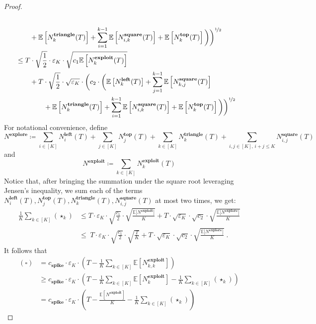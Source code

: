 \documentclass[final,12pt]{colt2025}
\newcommand{\E}{\mathbb{E}}
\newcommand{\e}{\varepsilon}
\newcommand{\lrb}[1]{\left(#1\right)}
\newcommand{\lsb}[1]{\left[#1\right]}
\newcommand{\bsb}[1]{\bigl[#1\bigr]}
\newcommand{\nc}{c}
\begin{document}
{\begin{proof}
\begin{align*}
\\
& \qquad
+
    \E\lsb{N^{\textbf{triangle}}_{k}(T)}
    + \sum_{i=1}^{k-1} \E\lsb{N^{\textbf{square}}_{i,k}(T)}
    + \E\lsb{N^{\textbf{top}}_k(T)}\bigg) \bigg)^{\nicefrac{1}{2}}
\\
&\le
      T \cdot \sqrt{ \frac{1}{2} } \cdot \e_K \cdot \sqrt{ \nc_1 \E\lsb{ N^{\textbf{exploit}}_k(T)}}
\\
&\qquad +
    T \cdot \sqrt{ \frac{1}{2} } \cdot \sqrt{\e_K} \cdot \bigg( c_2 \cdot \bigg(\E\lsb{N^{\textbf{left}}_k(T)}
    + \sum_{j=1}^{k-1} \E\lsb{N^{\textbf{square}}_{k,j}(T)}
\\
&\qquad\qquad
+
    \E\lsb{N^{\textbf{triangle}}_{k}(T)}
    + \sum_{i=1}^{k-1} \E\lsb{N^{\textbf{square}}_{i,k}(T)}
    + \E\lsb{N^{\textbf{top}}_k(T)}\bigg) \bigg)^{\nicefrac{1}{2}}
\end{align*}
For notational convenience, define
\[
    N^{\textbf{explore}}
\coloneqq
    \sum_{i \in [K]} N^{\textbf{left}}_i(T) + \sum_{j \in [K]} N^{\textbf{top}}_j(T) + \sum_{k \in [K]} N^{\textbf{triangle}}_k(T) +
    \sum_{i,j\in [K], \, i+j\le K} N^{\textbf{square}}_{i,j}(T)
\]
and
\[
    N^{\textbf{exploit}}
\coloneqq
    \sum_{k \in [K]} N^{\textbf{exploit}}_k(T)
\]
Notice that, after bringing the summation under the square root leveraging Jensen's inequality, we sum each of the terms $N^{\textbf{left}}_i(T), N^{\textbf{top}}_j(T), N^{\textbf{triangle}}_k(T), N^{\textbf{square}}_{i,j}(T)$ at most two times, we get:
\begin{align*}
    \frac{1}{K}\sum_{k \in [K]} (\star_k)
&\le
    T\cdot \e_K \cdot \sqrt{\frac{\nc_1}{2}} \cdot \sqrt{\frac{\E\bsb{N^{\textbf{exploit}}}}{K}}
+
    T\cdot \sqrt{\e_K} \cdot \sqrt{ c_2} \cdot \sqrt{ \frac{\E\bsb{N^{\textbf{explore}}}}{K}}
\\
&\le\;
    T\cdot \e_K \cdot \sqrt{\frac{\nc_1}{2}} \cdot \sqrt{\frac{T}{K}}
+
    T\cdot \sqrt{\e_K} \cdot \sqrt{ c_2} \cdot \sqrt{ \frac{\E\bsb{N^{\textbf{explore}}}}{K}} \;.
\end{align*}
It follows that
\begin{align*}
     (\square)
&=
    c_{\textbf{spike}} \cdot \e_K \cdot \lrb{ T - \frac{1}{K}\sum_{k \in [K]} \E[N^{\textbf{exploit}}_{k,k}]}
\\
&\ge
    c_{\textbf{spike}} \cdot \e_K \cdot \lrb{ T - \frac{1}{K}\sum_{k \in [K]} \E[N^{\textbf{exploit}}_{k}] - \frac{1}{K}\sum_{k\in[K]}(\star_k)}
\\
&=
    c_{\textbf{spike}} \cdot \e_K  \cdot \lrb{ T - \frac{\E[N^{\textbf{exploit}}]}{K} - \frac{1}{K}\sum_{k\in[K]}(\star_k)}

\end{align*}
\end{proof}}
\end{document}
